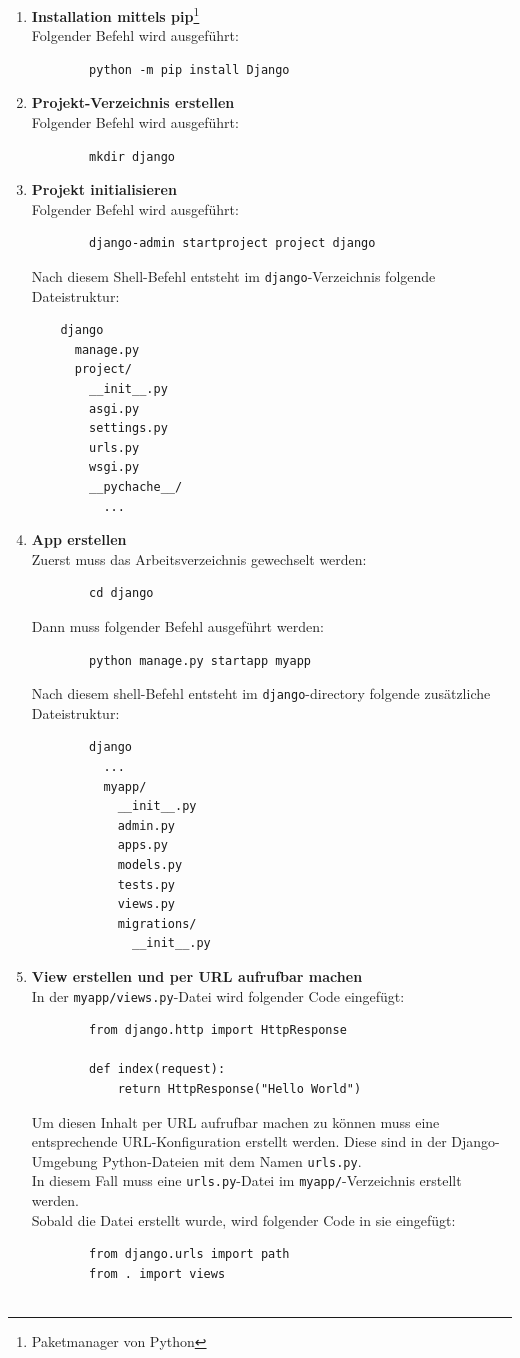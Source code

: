 \documentclass[letterpaper,11pt,leqno]{article}
\begin{document}
\begin{enumerate}
	\item\textbf{Installation mittels pip}\footnote{Paketmanager von Python}\\Folgender Befehl wird ausgeführt:
	\begin{verbatim}
		python -m pip install Django
	\end{verbatim}
	\item\textbf{Projekt-Verzeichnis erstellen}\\Folgender Befehl wird ausgeführt:
	\begin{verbatim}
		mkdir django
	\end{verbatim}
	\item\textbf{Projekt initialisieren}\\Folgender Befehl wird ausgeführt:
	\begin{verbatim}
		django-admin startproject project django
	\end{verbatim}
	Nach diesem Shell-Befehl entsteht im \verb|django|-Verzeichnis folgende Dateistruktur:
	\begin{verbatim}
	django
	  manage.py
	  project/
	    __init__.py
	    asgi.py
	    settings.py
	    urls.py
	    wsgi.py
	    __pychache__/
	      ...
	\end{verbatim}
	\item\textbf{App erstellen}\\Zuerst muss das Arbeitsverzeichnis gewechselt werden:
	\begin{verbatim}
		cd django
	\end{verbatim}
	Dann muss folgender Befehl ausgeführt werden:
	\begin{verbatim}
		python manage.py startapp myapp
	\end{verbatim}
	Nach diesem shell-Befehl entsteht im \verb|django|-directory folgende zusätzliche\\Dateistruktur:
	\begin{verbatim}
		django
		  ...
		  myapp/
		    __init__.py
		    admin.py
		    apps.py
		    models.py
		    tests.py
		    views.py
		    migrations/
		      __init__.py
	\end{verbatim}
	\item\textbf{View erstellen und per URL aufrufbar machen}\\In der \verb|myapp/views.py|-Datei wird folgender Code eingefügt:
	\begin{verbatim}
		from django.http import HttpResponse

		def index(request):
    		return HttpResponse("Hello World")
	\end{verbatim}
	Um diesen Inhalt per URL aufrufbar machen zu können muss eine entsprechende URL-Konfiguration erstellt werden. Diese sind in
	der Django-Umgebung Python-Dateien mit dem Namen \verb|urls.py|.\\In diesem Fall muss eine \verb|urls.py|-Datei im
	\verb|myapp/|-Verzeichnis erstellt werden.\\Sobald die Datei erstellt wurde, wird folgender Code in sie eingefügt:
	\begin{verbatim}
		from django.urls import path
		from . import views


\end{verbatim}
\end{enumerate}
\end{document}
